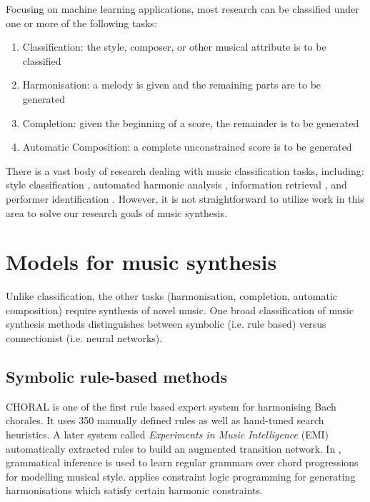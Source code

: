 \documentclass[dissertation.tex]{subfiles}
\begin{document}
Focusing on machine learning applications, most research can be
classified under one or more of the following tasks:
\begin{enumerate}
  \item Classification: the style, composer, or other musical attribute is to be classified
  \item Harmonisation: a melody is given and the remaining parts are to be generated
  \item Completion: given the beginning of a score, the remainder is to be generated
  \item Automatic Composition: a complete unconstrained score is to be generated
\end{enumerate}

There is a vast body of research dealing with music classification tasks,
including: style classification \cite{Herlands2014}
\cite{dannenberg1997machine}, automated harmonic analysis \cite{ni2012end},
information retrieval \cite{mandel2006support}, and performer identification
\cite{stamatatos2005automatic}. However, it is not straightforward to utilize
work in this area to solve our research goals of music synthesis.

\section{Models for music synthesis}

Unlike classification, the other tasks (harmonisation, completion, automatic
composition) require synthesis of novel music. One broad classification of
music synthesis methods \cite{toiviainen2000symbolic} distinguishes between
symbolic (i.e. rule based) versus connectionist (i.e. neural networks).

\subsection{Symbolic rule-based methods}

CHORAL \cite{ebciouglu1988expert} is one of the first rule based expert system
for harmonising Bach chorales. It uses 350 manually defined rules as well as
hand-tuned search heuristics. A later system called \emph{Experiments in Music
Intelligence} (EMI) \cite{cope1992computer} automatically extracted rules to
build an augmented transition network\cite{wanner1980atn}. In
\cite{cruz1998learning}, grammatical inference is used to learn regular
grammars over chord progressions for modelling musical style.
\cite{tsang1991harmonizing} applies constraint logic programming for generating
harmonisations which satisfy certain harmonic constraints.
\end{document}
